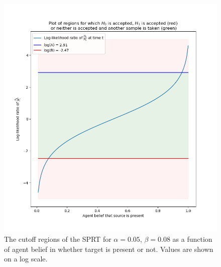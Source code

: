 \begin{figure}
    \centering
    \includegraphics[width = 0.75\linewidth]{Chapters/MultiAgentTargetDetection/Figs/SearchTermination/CutoffRegions.png}
    \caption{The cutoff regions of the SPRT for $\alpha=0.05$, $\beta=0.08$ as a function of agent belief in whether target is present or not. Values are shown on a log scale.}
    \label{fig:SPRTLogLikelihoodRatio}
\end{figure}




